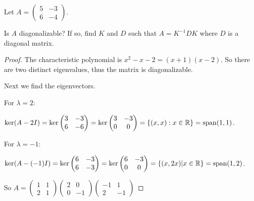 \documentclass{amsart}
\begin{document}
	
\vspace{2em}


Let $A=\begin{pmatrix}
	5&-3\\6&-4
\end{pmatrix}$. 

Is $A$ diagonalizable? If so, find $K$ and $D$ such that $A=K^{-1}DK$ where $D$ is a diagonal matrix.

\begin{proof}
	The characteristic polynomial is $x^2-x-2=(x+1)(x-2)$. So there are two distinct eigenvalues, thus the matrix is diagonalizable.
	
	Next we find the eigenvectors.
	
	For $\lambda=2$:
	
	$\ker (A-2I)=\ker\begin{pmatrix}
	3&-3\\6&-6
\end{pmatrix}=\ker \begin{pmatrix}
	3&-3\\0&0
\end{pmatrix}=\{(x,x):x\in\mathbb{R}\}=\operatorname{span}(1,1)$.

For $\lambda=-1$:

$\ker(A-(-1)I)= \ker\begin{pmatrix}
	6&-3\\6&-3
\end{pmatrix}=\ker\begin{pmatrix}
	6&-3\\0&0
\end{pmatrix}=\{(x,2x)|x\in\mathbb{R}\}=\operatorname{span}(1,2)$.

So $A=\begin{pmatrix}
	1&1\\2&1
\end{pmatrix}\begin{pmatrix}
	2&0\\0&-1
\end{pmatrix}
\begin{pmatrix}
	-1&1\\2&-1
\end{pmatrix}
$
	
\end{proof}

%
%
\end{document}
